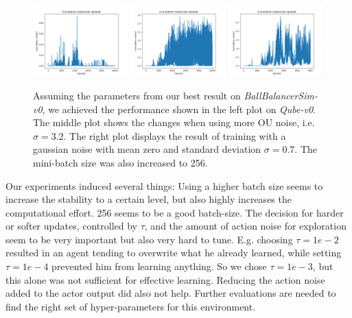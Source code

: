 \begin{figure}
	\begin{center}
	\includegraphics[width=0.325\textwidth]{plots/ddpg_qube_ou_bad_train.png}
	\includegraphics[width=0.325\textwidth]{plots/ddpg_qube_ou_better_train.png}
	\includegraphics[width=0.325\textwidth]{plots/ddpg_qube_gauss.png}
	\caption{Assuming the parameters from our best result on \textit{BallBalancerSim-v0}, we achieved the performance shown in the left plot on \textit{Qube-v0}. The middle plot shows the changes when using more OU noise, i.e. $\sigma=3.2$. The right plot displays the result of training with a gaussian noise with mean zero and 
	standard deviation $\sigma=0.7$. The mini-batch size was also increased to 
	256.}
	\label{ddpg:qube}
	\end{center}
\end{figure}
\noindent Our experiments induced several things: Using a higher batch size seems to increase the stability to a certain level, but also highly increases the computational effort. 256 seems to be a good batch-size. The decision for harder or softer updates, controlled by $\tau$, and the amount of action noise for exploration seem to be very important but also very hard to tune. E.g. choosing $\tau=1e-2$ resulted in an agent tending to overwrite what he already learned, while setting $\tau=1e-4$ prevented him from learning anything. So we chose $\tau=1e-3$, but this alone was not sufficient for effective learning. Reducing the action noise added to the actor output did also not help. Further evaluations are needed to find the right set of hyper-parameters for this environment. 


